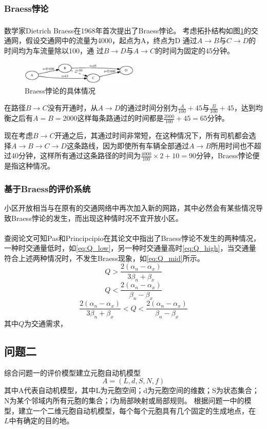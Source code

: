 \documentclass[fontset=windows,a4paper,12pt]{ctexart}
\newcommand{\upcite}[1]{\textsuperscript{\textsuperscript{\cite{#1}}}}
\begin{document}
			
		\subsubsection{Braess悖论}
			数学家Dietrich Braess在1968年首次提出了Braess悖论\upcite{Braess1968Ü}。
			考虑拓扑结构如图\ref{fig:braess}的交通网，假设交通网中的流量为4000，起点为A，终点为D
			通过$ A \rightarrow B $与$ C \rightarrow D $的时间均为车流量除以100，通
			过$ B \rightarrow D $与$ A \rightarrow C $的时间为固定的45分钟。
			\begin{figure}[!htbp]
				\centering
				\includegraphics[width=0.5\textwidth]{pic/braess.eps}
				\caption{Braess悖论的具体情况}
				\label{fig:braess}
			\end{figure}
			在路径$ B \rightarrow C $没有开通时，从$ A \rightarrow D $的通过时间分别为$ \frac{A}{100}+45 $与$ \frac{B}
			{100} + 45 $，达到均衡之后有$ A=B=2000 $这样每条路通过的时间都是$ \frac{2000}{100}
			+45=65 $分钟。
			
			现在考虑$ B \rightarrow C $开通之后，其通过时间非常短，在这种情况下，所有司机都会选择$ A \rightarrow B \rightarrow C \rightarrow D $这条路线，因为即使所有车辆全部通过$ A \rightarrow B $所用时间也不超过40分钟，这样所有通过这条路径的时间为$ \frac{4000}{100}\times 2+10=90$分钟，Braess悖论便是指这种情况。
			\subsubsection{基于Braess的评价系统}
			小区开放相当与在原有的交通网络中再次加入新的网路，其中必然会有某些情况导致Braess悖论的发生，而出现这种情时况不宜开放小区。
			
			查阅论文可知Pas和Principcipio在其论文中指出了Braess悖论不发生的两种情况\upcite{pas1997braess}，一种时交通量低时，如\ref{eq:Q_low}，另一种时交通量高时\ref{eq:Q_high}，当交通量符合上述两种情况时，不发生Braess现象，如\ref{eq:Q_mid}所示。
			\begin{equation}
			Q>\frac{2(\alpha_n-\alpha_x)}{3\beta_n+\beta_x}
				\label{eq:Q_low}
			\end{equation}
			\begin{equation}
				Q<\frac{2(\alpha_n-\alpha_x)}{\beta_n-\beta_x}
				\label{eq:Q_high}
			\end{equation}
			\begin{equation}
			\frac{2(\alpha_n-\alpha_x)}{3\beta_n+\beta_x}<Q<\frac{2(\alpha_n-\alpha_x)}{\beta_n-\beta_x}
			\label{eq:Q_mid}
			\end{equation}
			其中$ Q $为交通需求，		
	\subsection{问题二}
		综合问题一的评价模型建立元胞自动机模型
		\begin{equation}
			A=(L,d,S,N,f)
		\end{equation}
		其中A代表自动机模型，其中L为元胞空间；d为元胞空间的维数；S为状态集合；N为某个邻域内所有元胞的集合；f为局部映射或局部规则。
		根据问题一中的模型，建立一个二维元胞自动机模型，每个每个元胞具有几个固定的生成地点，在
		$ L $中有确定的目的地。
  \newpage
  
  
\end{document}

